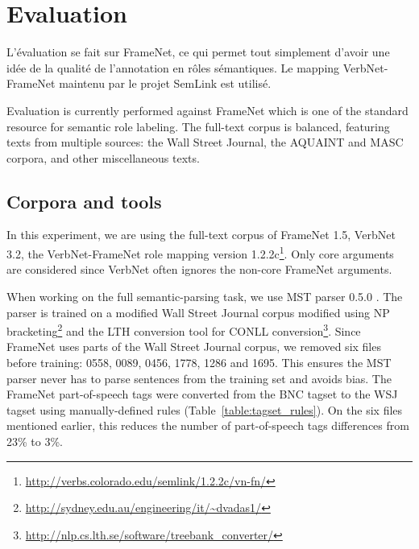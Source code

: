 \section{Evaluation}

L'évaluation se fait sur FrameNet, ce qui permet tout simplement d'avoir une
idée de la qualité de l'annotation en rôles sémantiques. Le mapping
VerbNet-FrameNet maintenu par le projet SemLink est utilisé.

Evaluation is currently performed against FrameNet which is one of the standard
resource for semantic role labeling. The full-text corpus is balanced,
featuring texts from multiple sources: the Wall Street Journal, the AQUAINT and
MASC corpora, and other miscellaneous texts.

\subsection{Corpora and tools}

In this experiment, we are using the full-text corpus of FrameNet 1.5, VerbNet
3.2, the VerbNet-FrameNet role mapping version
1.2.2c\footnote{\url{http://verbs.colorado.edu/semlink/1.2.2c/vn-fn/}}. Only
core arguments are considered since VerbNet often ignores the non-core FrameNet
arguments.

When working on the full semantic-parsing task, we use MST parser 0.5.0
\citep{mcdonald2006multilingual}. The parser is trained on a modified Wall
Street Journal corpus modified using NP
bracketing\footnote{\url{http://sydney.edu.au/engineering/it/~dvadas1/}} and
the LTH conversion tool for CONLL
conversion\footnote{\url{http://nlp.cs.lth.se/software/treebank_converter/}}.
Since FrameNet uses parts of the Wall Street Journal corpus, we removed six
files before training: 0558, 0089, 0456, 1778, 1286 and 1695. This ensures the
MST parser never has to parse sentences from the training set and avoids bias.
The FrameNet part-of-speech tags were converted from the BNC tagset to the WSJ
tagset using manually-defined rules (Table~\ref{table:tagset_rules}). On the
six files mentioned earlier, this reduces the number of part-of-speech tags
differences from 23\% to 3\%.


